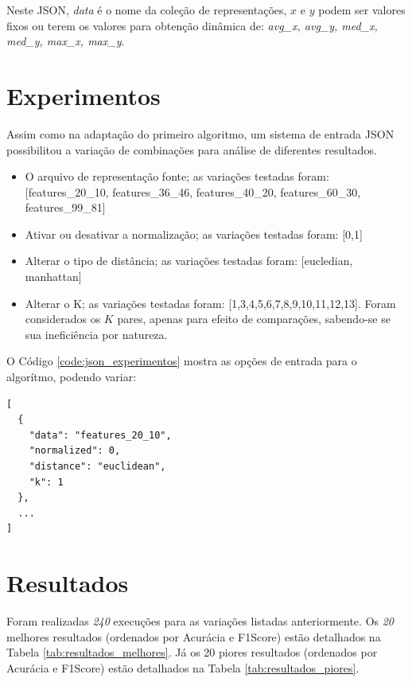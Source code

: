 \documentclass[12pt]{article}
\begin{document}
Neste JSON, \textit{data} é o nome da coleção de representações, $x$ e $y$ podem ser valores fixos ou terem os valores para obtenção dinâmica de: \textit{avg\_x, avg\_y, med\_x, med\_y, max\_x, max\_y}.

\section{Experimentos}

Assim como na adaptação do primeiro algoritmo, um sistema de entrada JSON possibilitou a variação de combinações para análise de diferentes resultados.

\begin{itemize}
  \item O arquivo de representação fonte; as variações testadas foram: [features\_20\_10, features\_36\_46, features\_40\_20, features\_60\_30, features\_99\_81]
  \item Ativar ou desativar a normalização; as variações testadas foram: [0,1]
  \item Alterar o tipo de distância; as variações testadas foram: [eucledian, manhattan]
  \item Alterar o K; as variações testadas foram: [1,3,4,5,6,7,8,9,10,11,12,13]. Foram considerados os $K$ pares, apenas para efeito de comparações, sabendo-se se sua ineficiência por natureza.
\end{itemize}

\newpage

O Código \ref{code:json_experimentos} mostra as opções de entrada para o algorítmo, podendo variar:

\begin{lstlisting}[caption={JSON para experimentos},captionpos=b,frame=single,label={code:json_experimentos}]
[
  {
    "data": "features_20_10",
    "normalized": 0,
    "distance": "euclidean",
    "k": 1
  },
  ...
]
\end{lstlisting}

\section{Resultados}

Foram realizadas \textit{240} execuções para as variações listadas anteriormente. Os \textit{20} melhores resultados (ordenados por Acurácia e F1Score) estão detalhados na Tabela \ref{tab:resultados_melhores}. Já os 20 piores resultados (ordenados por Acurácia e F1Score) estão detalhados na Tabela \ref{tab:resultados_piores}.
\end{document}
